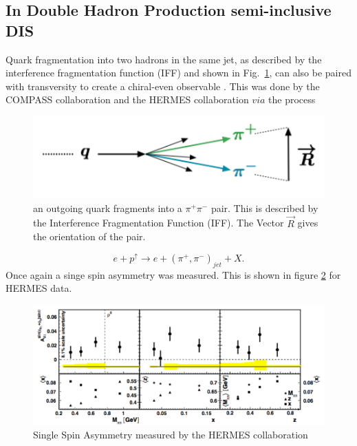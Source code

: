 \documentclass[letterpaper, abstract = on,listof=totoc, bibliography=totoc]{scrreprt}
\begin{document}
\subsection{In Double Hadron Production semi-inclusive DIS}
\label{subSec:doublehadProd}
Quark fragmentation into two hadrons in the same jet, as described by the interference fragmentation function (IFF) and shown in Fig.~\ref{fig:IFF}, can also be paired with transversity to create a chiral-even observable \cite{EFREMOV1992394, Bianconi:1999cd}. This was done by the COMPASS collaboration \cite{compassRes} and the HERMES collaboration \cite{hermesRes} $via$ the process
\begin{figure}
\begin{center}
\includegraphics[width = .7\textwidth]{IFFwrite}
\caption[Interference Fragmentation Function]{an outgoing quark fragments into a $\pi^+\pi^-$ pair. This is described by the Interference Fragmentation Function (IFF). The Vector $\vec{R}$ gives the orientation of the pair.}
\label{fig:IFF}
\end{center}
\end{figure}
 \begin{equation}
e+p^\uparrow \rightarrow e + (\pi^+,\pi^-)_{jet} + X.
\end{equation}
Once again a singe spin asymmetry was measured. This is shown in figure \ref{fig:hermesAsym} for HERMES data.
 \begin{figure}
\begin{center}
\includegraphics[width = 1\textwidth]{hermesAsym}
\caption[Single Spin Asymmetry measured by the HERMES collaboration]{Single Spin Asymmetry measured by the HERMES collaboration \cite{hermesRes}}
\label{fig:hermesAsym}
\end{center}
\end{figure}
\end{document}
